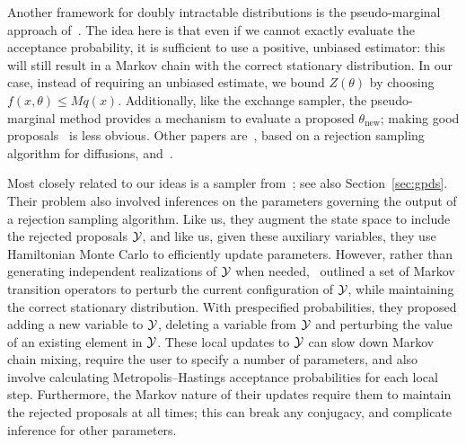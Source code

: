 Another framework for doubly intractable distributions is the pseudo-marginal approach of~\cite{AndRob10}. The idea here is that even if we 
cannot exactly evaluate the acceptance probability, it is sufficient to use a positive, unbiased estimator: this will still result in a Markov chain with the 
correct stationary distribution. In our case, instead of requiring an unbiased estimate, we bound $Z(\theta)$ by
choosing $f(x,\theta) \le Mq(x)$.
Additionally, like the exchange sampler, the pseudo-marginal method 
provides a mechanism to evaluate a proposed 
$\theta_{\mathrm{new}}$; making good proposals~\citep{DahlinLS15} is less obvious. 
Other papers are~\cite{beskos06}, 
based on a rejection sampling algorithm for diffusions, 
and~\cite{walker11}.

 Most closely related to our ideas is a sampler from~\cite{adams_gpds}; see also  Section~\ref{sec:gpds}. Their problem also
involved inferences on the parameters governing the output of a rejection sampling algorithm. Like us, they  augment the state space to
include the rejected proposals $\mathcal{Y}$, and like us, given these auxiliary variables, they use Hamiltonian Monte Carlo to efficiently update parameters. 
However, rather than generating independent realizations of $\mathcal{Y}$ when needed,~\cite{adams_gpds}
outlined a set of Markov transition operators to perturb the current configuration of $\mathcal{Y}$,
while maintaining the correct
stationary distribution. With prespecified probabilities, they proposed adding a new variable to $\mathcal{Y}$, deleting a variable from $\mathcal{Y}$
and perturbing the value of an existing element in $\mathcal{Y}$. These local updates to $\mathcal{Y}$ can slow down Markov chain mixing, require the user to specify
a number of parameters, and  also involve calculating Metropolis--Hastings acceptance probabilities for each local step. Furthermore, the Markov nature 
of their updates require them to maintain the rejected proposals at all times; this can break any conjugacy, and
complicate inference for other parameters.


